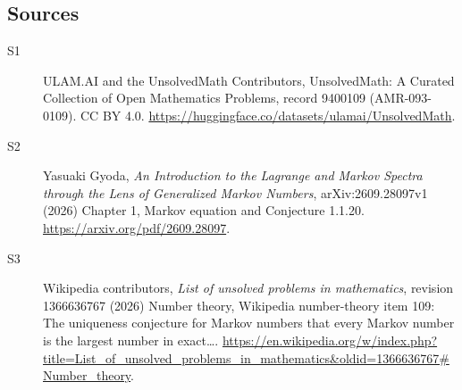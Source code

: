 \documentclass[11pt]{article}
\begin{document}
\subsection{Sources}
\begin{description}
\item[\hypertarget{source:9400109:1}{S1}] ULAM.AI and the UnsolvedMath Contributors, UnsolvedMath: A Curated Collection of Open Mathematics Problems, record 9400109 (AMR-093-0109). CC BY 4.0. \url{https://huggingface.co/datasets/ulamai/UnsolvedMath}.
\item[\hypertarget{source:9400109:2}{S2}] Yasuaki Gyoda, \emph{An Introduction to the Lagrange and Markov Spectra through the Lens of Generalized Markov Numbers}, arXiv:2609.28097v1 (2026) Chapter 1, Markov equation and Conjecture 1.1.20. \url{https://arxiv.org/pdf/2609.28097}.
\item[\hypertarget{source:9400109:3}{S3}] Wikipedia contributors, \emph{List of unsolved problems in mathematics}, revision 1366636767 (2026) Number theory, Wikipedia number-theory item 109: The uniqueness conjecture for Markov numbers that every Markov number is the largest number in exact…. \url{https://en.wikipedia.org/w/index.php?title=List_of_unsolved_problems_in_mathematics&oldid=1366636767#Number_theory}.
\end{description}
\label{end:9400109}
\end{document}
